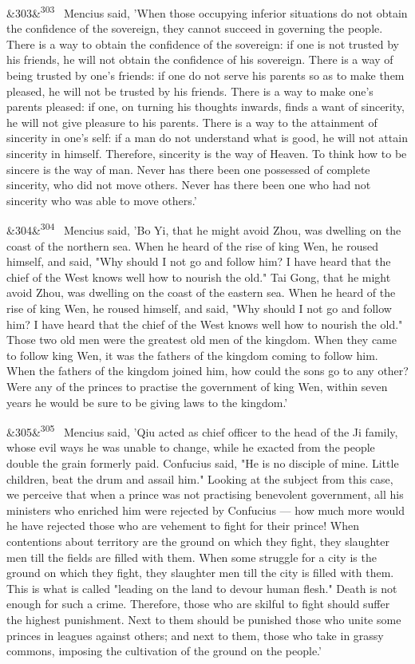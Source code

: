 \documentclass[12pt]{article}
\newcommand{\para}[1][]{\par\noindent\ifx&#1&\else\textsuperscript{\footnotesize #1}~\fi}
\begin{document}
\para[303] Mencius said, 'When those occupying inferior situations do not obtain the confidence of the sovereign, they cannot succeed in governing the people. There is a way to obtain the confidence of the sovereign: if one is not trusted by his friends, he will not obtain the confidence of his sovereign. There is a way of being trusted by one's friends: if one do not serve his parents so as to make them pleased, he will not be trusted by his friends. There is a way to make one's parents pleased: if one, on turning his thoughts inwards, finds a want of sincerity, he will not give pleasure to his parents. There is a way to the attainment of sincerity in one's self: if a man do not understand what is good, he will not attain sincerity in himself. Therefore, sincerity is the way of Heaven. To think how to be sincere is the way of man. Never has there been one possessed of complete sincerity, who did not move others. Never has there been one who had not sincerity who was able to move others.'

\para[304] Mencius said, 'Bo Yi, that he might avoid Zhou, was dwelling on the coast of the northern sea. When he heard of the rise of king Wen, he roused himself, and said, "Why should I not go and follow him? I have heard that the chief of the West knows well how to nourish the old." Tai Gong, that he might avoid Zhou, was dwelling on the coast of the eastern sea. When he heard of the rise of king Wen, he roused himself, and said, "Why should I not go and follow him? I have heard that the chief of the West knows well how to nourish the old." Those two old men were the greatest old men of the kingdom. When they came to follow king Wen, it was the fathers of the kingdom coming to follow him. When the fathers of the kingdom joined him, how could the sons go to any other? Were any of the princes to practise the government of king Wen, within seven years he would be sure to be giving laws to the kingdom.'

\para[305] Mencius said, 'Qiu acted as chief officer to the head of the Ji family, whose evil ways he was unable to change, while he exacted from the people double the grain formerly paid. Confucius said, "He is no disciple of mine. Little children, beat the drum and assail him." Looking at the subject from this case, we perceive that when a prince was not practising benevolent government, all his ministers who enriched him were rejected by Confucius --- how much more would he have rejected those who are vehement to fight for their prince! When contentions about territory are the ground on which they fight, they slaughter men till the fields are filled with them. When some struggle for a city is the ground on which they fight, they slaughter men till the city is filled with them. This is what is called "leading on the land to devour human flesh." Death is not enough for such a crime. Therefore, those who are skilful to fight should suffer the highest punishment. Next to them should be punished those who unite some princes in leagues against others; and next to them, those who take in grassy commons, imposing the cultivation of the ground on the people.'
\end{document}
